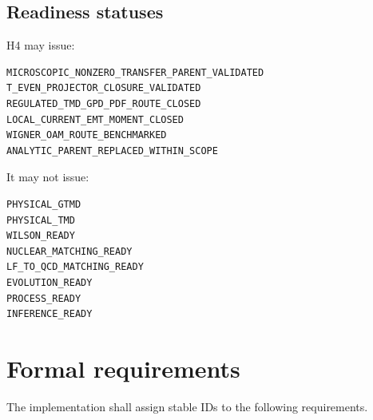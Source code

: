 \documentclass[11pt]{article}
\begin{document}
\subsection{Readiness statuses}

H4 may issue:
\begin{verbatim}
MICROSCOPIC_NONZERO_TRANSFER_PARENT_VALIDATED
T_EVEN_PROJECTOR_CLOSURE_VALIDATED
REGULATED_TMD_GPD_PDF_ROUTE_CLOSED
LOCAL_CURRENT_EMT_MOMENT_CLOSED
WIGNER_OAM_ROUTE_BENCHMARKED
ANALYTIC_PARENT_REPLACED_WITHIN_SCOPE
\end{verbatim}
It may not issue:
\begin{verbatim}
PHYSICAL_GTMD
PHYSICAL_TMD
WILSON_READY
NUCLEAR_MATCHING_READY
LF_TO_QCD_MATCHING_READY
EVOLUTION_READY
PROCESS_READY
INFERENCE_READY
\end{verbatim}

\section{Formal requirements}
\label{sec:requirements}

The implementation shall assign stable IDs to the following requirements.
\end{document}
